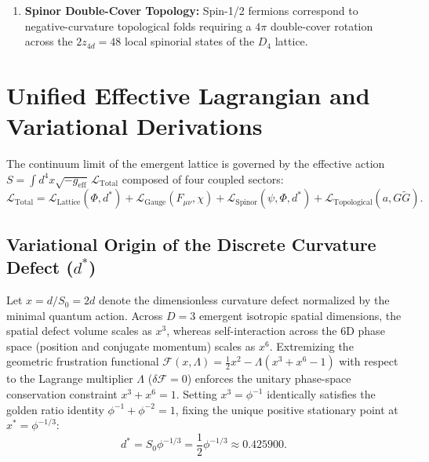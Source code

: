 \documentclass[11pt,a4paper]{article}
\begin{document}
\begin{enumerate}
    \item \textbf{Spinor Double-Cover Topology:} Spin-1/2 fermions correspond to negative-curvature topological folds requiring a $4\pi$ double-cover rotation across the $2z_{4d} = 48$ local spinorial states of the $D_4$ lattice.
\end{enumerate}

\section{Unified Effective Lagrangian and Variational Derivations}

The continuum limit of the emergent lattice is governed by the effective action $S = \int d^4x \sqrt{-g_{\text{eff}}}\,\mathcal{L}_{\text{Total}}$ composed of four coupled sectors:
\begin{equation}
    \mathcal{L}_{\text{Total}} = \mathcal{L}_{\text{Lattice}}(\Phi, d^*) + \mathcal{L}_{\text{Gauge}}(F_{\mu\nu}, \chi) + \mathcal{L}_{\text{Spinor}}(\psi, \Phi, d^*) + \mathcal{L}_{\text{Topological}}(a, G\tilde{G}).
\end{equation}

\subsection{Variational Origin of the Discrete Curvature Defect ($d^*$)}
Let $x = d / S_0 = 2d$ denote the dimensionless curvature defect normalized by the minimal quantum action. Across $D = 3$ emergent isotropic spatial dimensions, the spatial defect volume scales as $x^3$, whereas self-interaction across the 6D phase space (position and conjugate momentum) scales as $x^6$. Extremizing the geometric frustration functional $\mathcal{F}(x, \Lambda) = \frac{1}{2}x^2 - \Lambda(x^3 + x^6 - 1)$ with respect to the Lagrange multiplier $\Lambda$ ($\delta\mathcal{F} = 0$) enforces the unitary phase-space conservation constraint $x^3 + x^6 = 1$. Setting $x^3 = \phi^{-1}$ identically satisfies the golden ratio identity $\phi^{-1} + \phi^{-2} = 1$, fixing the unique positive stationary point at $x^* = \phi^{-1/3}$:
\begin{equation}
    d^* = S_0 \phi^{-1/3} = \frac{1}{2}\phi^{-1/3} \approx 0.425900.
\end{equation}
\end{document}
